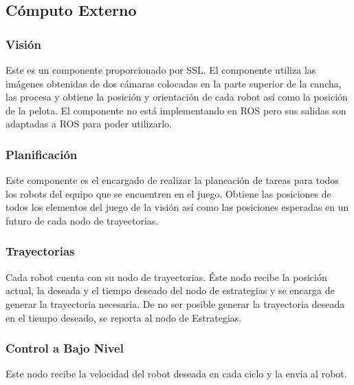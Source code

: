 \documentclass[twocolumn,10pt]{amrob}
\begin{document}
\subsection*{Cómputo Externo}
\subsubsection*{Visión}
Este es un componente proporcionado por SSL. El componente utiliza las imágenes obtenidas de dos cámaras colocadas en la parte superior de la cancha, las procesa y obtiene la posición y orientación de cada robot así como la posición de la pelota. El componente no está implementando en ROS pero sus salidas son adaptadas a ROS para poder utilizarlo.
\subsubsection*{Planificación}
Este componente es el encargado de realizar la planeación de tareas para todos los robots del equipo que se encuentren en el juego. Obtiene las posiciones de todos los elementos del juego de la visión así como las posiciones esperadas en un futuro de cada nodo de trayectorias.
\subsubsection*{Trayectorias}
Cada robot cuenta con su nodo de trayectorias. Éste nodo recibe la posición actual, la deseada y el tiempo deseado del nodo de estrategias y se encarga de generar la trayectoria necesaria. De no ser posible generar la trayectoria deseada en el tiempo deseado, se reporta al nodo de Estrategias.
\subsubsection*{Control a Bajo Nivel}
Este nodo recibe la velocidad del robot deseada en cada ciclo y la envía al robot. 
\end{document}
